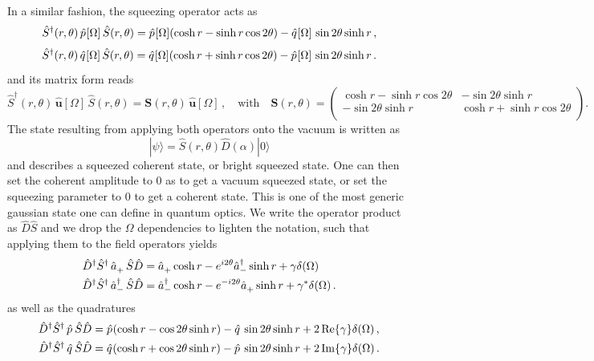 In a similar fashion, the squeezing operator acts as
\[\hat{S}^\dagger(r, \theta) \,\hat{p}^{\vphantom{\dagger}}[\Omega] \, \hat{S}(r, \theta) = \hat{p}^{\vphantom{\dagger}}[\Omega] (\cosh r - \sinh r \cos 2\theta) - \hat{q}^{\vphantom{\dagger}}[\Omega] \, \sin 2\theta \sinh r \,,\]
\[\hat{S}^\dagger(r, \theta) \,\hat{q}^{\vphantom{\dagger}}[\Omega] \, \hat{S}(r, \theta) = \hat{q}^{\vphantom{\dagger}}[\Omega] (\cosh r + \sinh r \cos 2\theta) - \hat{p}^{\vphantom{\dagger}}[\Omega] \, \sin 2\theta \sinh r \,.\]
and its matrix form reads
\[\hat{S}^\dagger(r, \theta) \,\mathbf{\hat{u}}[\Omega] \, \hat{S}(r, \theta) = \mathbf{S}(r, \theta) \, \mathbf{\hat{u}}[\Omega] \,, \quad \text{with} \quad \mathbf{S}(r, \theta) = \begin{pmatrix}
\cosh r - \sinh r \cos 2\theta & - \sin 2\theta \sinh r \\[6pt]
- \sin 2\theta \sinh r & \cosh r + \sinh r \cos 2\theta \\
\end{pmatrix}.\]
The state resulting from applying both operators onto the vacuum is written as
\[|\psi\rangle = \hat{S}(r, \theta) \hat{D}(\alpha)  |0\rangle\]
and describes a squeezed coherent state, or bright squeezed state. One can then set the coherent amplitude to 0 as to get a vacuum squeezed state, or set the squeezing parameter to 0 to get a coherent state. This is one of the most generic gaussian state one can define in quantum optics.
We write the operator product as $\hat{D}\hat{S}$ and we drop the $\Omega$ dependencies to lighten the notation, such that applying them to the field operators yields 
\begin{align*}
\hat{D}^\dagger \hat{S}^\dagger  \,\hat{a}^{\vphantom{\dagger}}_+ \, \hat{S} \hat{D} & = \hat{a}^{\vphantom{\dagger}}_+ \cosh r - e^{i 2\theta} \hat{a}^\dagger_- \sinh r + \gamma \delta (\Omega) \, \\
\hat{D}^\dagger \hat{S}^\dagger  \,\hat{a}^{\dagger}_- \, \hat{S} \hat{D} & = \hat{a}^\dagger_- \cosh r - e^{-i 2\theta} \hat{a}^{\vphantom{\dagger}}_+ \sinh r + \gamma^* \delta (\Omega) \,.
\end{align*}
as well as the quadratures 
\begin{align*}
\hat{D}^\dagger \hat{S}^\dagger  \,\hat{p}^{\vphantom{\dagger}}\, \hat{S} \hat{D} & = \hat{p}^{\vphantom{\dagger}} (\cosh r - \cos 2\theta \sinh r) - \hat{q}^{\vphantom{\dagger}} \, \sin 2\theta \sinh r + 2 \Re{\gamma} \delta(\Omega) \,, \\
\hat{D}^\dagger \hat{S}^\dagger  \,\hat{q}^{\vphantom{\dagger}} \, \hat{S} \hat{D} & = \hat{q}^{\vphantom{\dagger}} (\cosh r + \cos 2\theta \sinh r) - \hat{p}^{\vphantom{\dagger}} \, \sin 2\theta \sinh r + 2 \Im{\gamma} \delta(\Omega) \,.
\end{align*}
